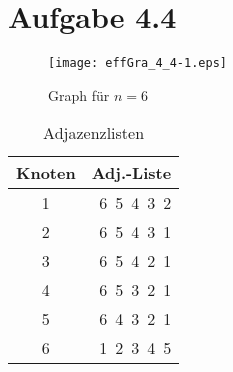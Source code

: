 \documentclass{scrartcl}
\begin{document}
\section{Aufgabe 4.4}
\begin{center}
\begin{figure}[h]
\texttt{[image: effGra\_4\_4-1.eps]}
\caption{Graph für $n=6$}
\end{figure}
\end{center}

\begin{table}[h]
  \centering

       \begin{tabular}{cr}
          Knoten          &Adj.-Liste\\
          \hline\hline
          1       &6\, 5\, 4\, 3\, 2\\
          2       &6\, 5\, 4\, 3\, 1\\
          3       &6\, 5\, 4\, 2\, 1\\
          4       &6\, 5\, 3\, 2\, 1\\
          5       &6\, 4\, 3\, 2\, 1\\
          6       &1\, 2\, 3\, 4\, 5\\
        \end{tabular}
  \caption{Adjazenzlisten}
  \label{tab:adjlis}
\end{table}
\end{document}
